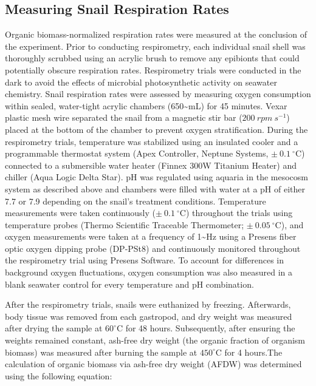 \documentclass{CSUNthesis}
\begin{document}
\subsection*{Measuring Snail Respiration Rates}\label{measuring-snail-respiration-rates}

Organic biomass-normalized respiration rates were measured at the conclusion of the experiment. Prior to conducting respirometry, each individual snail shell was thoroughly scrubbed using an acrylic brush to remove any epibionts that could potentially obscure respiration rates. Respirometry trials were conducted in the dark to avoid the effects of microbial photosynthetic activity on seawater chemistry. Snail respiration rates were assessed by measuring oxygen consumption within sealed, water-tight acrylic chambers (650\textasciitilde mL) for 45 minutes. Vexar plastic mesh wire separated the snail from a magnetic stir bar (\(200~rpm~s^{-1}\)) placed at the bottom of the chamber to prevent oxygen stratification. During the respirometry trials, temperature was stabilized using an insulated cooler and a programmable thermostat system (Apex Controller, Neptune Systems, \(\pm~0.1~^\circ\)C) connected to a submersible water heater (Finnex 300W Titanium Heater) and chiller (Aqua Logic Delta Star). pH was regulated using aquaria in the mesocosm system as described above and chambers were filled with water at a pH of either 7.7 or 7.9 depending on the snail's treatment conditions. Temperature measurements were taken continuously (\(\pm~0.1~^\circ\)C) throughout the trials using temperature probes (Thermo Scientific Traceable Thermometer; \(\pm~0.05~^\circ\)C), and oxygen measurements were taken at a frequency of 1\textasciitilde Hz using a Presens fiber optic oxygen dipping probe (DP-PSt8) and continuously monitored throughout the respirometry trial using Presens Software. To account for differences in background oxygen fluctuations, oxygen consumption was also measured in a blank seawater control for every temperature and pH combination.

After the respirometry trials, snails were euthanized by freezing. Afterwards, body tissue was removed from each gastropod, and dry weight was measured after drying the sample at \(60^\circ\)C for 48 hours. Subsequently, after ensuring the weights remained constant, ash-free dry weight (the organic fraction of organism biomass) was measured after burning the sample at \(450^\circ\)C for 4 hours.The calculation of organic biomass via ash-free dry weight (AFDW) was determined using the following equation:
\end{document}
